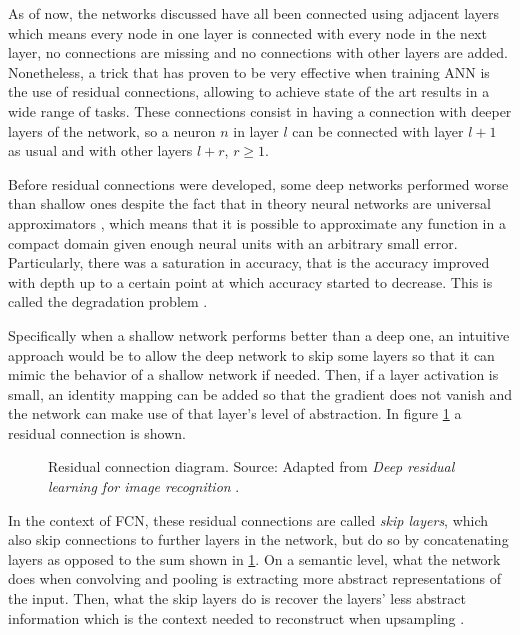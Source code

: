 As of now, the networks discussed have all been connected using adjacent layers which means every node in one layer is connected with every node in the next layer, no connections are missing and no connections with other layers are added. Nonetheless, a trick that has proven to be very effective when training ANN is the use of residual connections, allowing to achieve state of the art results in a wide range of tasks. These connections consist in having a connection with deeper layers of the network, so a neuron $n$ in layer $l$ can be connected with layer $l+1$ as usual and with other layers $l+r$, $r\geq 1$.

Before residual connections were developed, some deep networks performed worse than shallow ones despite the fact that in theory neural networks are universal approximators \cite{Hornik, Cybenko}, which means that it is possible to approximate any function in a compact domain given enough neural units with an arbitrary small error. Particularly, there was a saturation in accuracy, that is the accuracy improved with depth up to a certain point at which accuracy started to decrease. This is called the degradation problem \cite{res-connection}.

Specifically when a shallow network performs better than a deep one, an intuitive approach would be to allow the deep network to skip some layers so that it can mimic the behavior of a shallow network if needed. Then, if a layer activation is small, an identity mapping can be added so that the gradient does not vanish and the network can make use of that layer's level of abstraction. In figure \ref{fig:res-connection} a residual connection is shown. 

\begin{figure}
    \centering
    

    \caption[Residual connection diagram]{Residual connection diagram. Source: Adapted from \textit{Deep residual learning for image recognition} \cite{res-connection}.}
    \label{fig:res-connection}
\end{figure}

In the context of FCN, these residual connections are called \textit{skip layers}, which also skip connections to further layers in the network, but do so by concatenating layers as opposed to the sum shown in \ref{fig:res-connection}. On a semantic level, what the network does when convolving and pooling is extracting more abstract representations of the input. Then, what the skip layers do is recover the layers' less abstract information which is the context needed to reconstruct when upsampling \cite{Ronneberger}.

